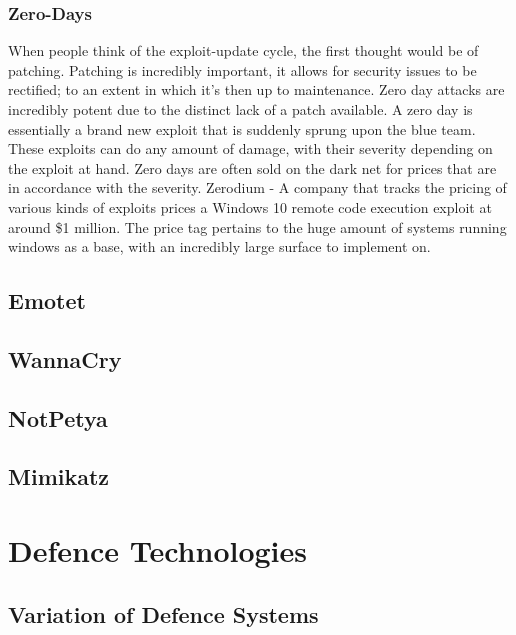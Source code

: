 
\subsection{Zero-Days}
When people think of the exploit-update cycle, the first thought would be of patching. Patching is incredibly important, it allows for security issues to be rectified; to an extent in which it's then up to maintenance. Zero day attacks are incredibly 
potent due to the distinct lack of a patch available. A zero day is essentially a brand new exploit that is suddenly sprung upon the blue team. These exploits can do any amount of damage, with their severity depending on the exploit at hand. 
Zero days are often sold on the dark net for prices that are in accordance with the severity. Zerodium - A company that tracks the pricing of various kinds of exploits prices a Windows 10 remote code execution exploit at around \$1 million. 
The price tag pertains to the huge amount of systems running windows as a base, with an incredibly large surface to implement on.


\section{Emotet}
\section{WannaCry}
\section{NotPetya}
\section{Mimikatz}



\chapter{Defence Technologies}
\section{Variation of Defence Systems}
